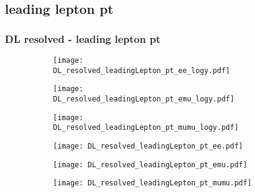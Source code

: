 \documentclass[aspectratio=169,8pt]{beamer}
\begin{document}
\subsection{leading lepton pt}
\begin{frame}
\frametitle{DL resolved - leading lepton pt}
\begin{figure}
\captionsetup[subfigure]{labelformat=empty}
\begin{subfigure}{0.32\textwidth}
\texttt{[image: DL\_resolved\_leadingLepton\_pt\_ee\_logy.pdf]}
\vspace*{-0.15cm}
\end{subfigure}
\hfil
\begin{subfigure}{0.32\textwidth}
\texttt{[image: DL\_resolved\_leadingLepton\_pt\_emu\_logy.pdf]}
\vspace*{-0.15cm}
\end{subfigure}
\hfil
\begin{subfigure}{0.32\textwidth}
\texttt{[image: DL\_resolved\_leadingLepton\_pt\_mumu\_logy.pdf]}
\vspace*{-0.15cm}
\end{subfigure}
\hfil
\begin{subfigure}{0.32\textwidth}
\texttt{[image: DL\_resolved\_leadingLepton\_pt\_ee.pdf]}
\vspace*{-0.15cm}
\end{subfigure}
\hfil
\begin{subfigure}{0.32\textwidth}
\texttt{[image: DL\_resolved\_leadingLepton\_pt\_emu.pdf]}
\vspace*{-0.15cm}
\end{subfigure}
\hfil
\begin{subfigure}{0.32\textwidth}
\texttt{[image: DL\_resolved\_leadingLepton\_pt\_mumu.pdf]}
\vspace*{-0.15cm}
\end{subfigure}
\hfil
\end{figure}
\end{frame}
\newpage
\end{document}
